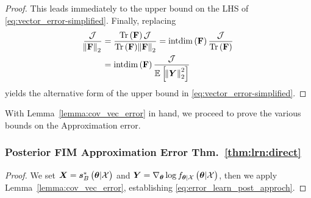 \begin{proof}
{   %
This leads immediately to the upper bound on the LHS of \eqref{eq:vector_error-simplified}.  
   } 
    Finally, replacing 
    \begin{align}
        \frac{\mathcal{J}}{\norm{\matsym{F}}_2}&=\frac{\trace{\matsym{\F}}\mathcal{J}}{\trace{\matsym{\F}}\norm{\matsym{F}}_2}=\mathrm{intdim}\brackets{\F}\frac{\mathcal{J}}{\trace{\matsym{\F}}}\nonumber\\
                                              &=\mathrm{intdim}\brackets{\F}\frac{\mathcal{J}}{\expectation{\norm{\Yr}_2^2}{}}
    \end{align}
    {yields the alternative form of the upper bound in \eqref{eq:vector_error-simplified}.}
\end{proof}
{With} Lemma~\ref{lemma:cov_vec_error} {in hand,} we {proceed to prove the various bounds on the {Approximation error}}.
\subsubsection{Posterior {FIM } {Approximation Error} {Thm.~\ref{thm:lrn:direct}}}\label{proof:post:lrn}
\begin{proof}
    We set $\Xr=\postscores{\p}{\xset}$ and $\Yr=\nabla_{\p}\log\probt{\p|\xset}{\p|\xset}$, then we apply Lemma~\ref{lemma:cov_vec_error}, 
    {establishing \eqref{eq:error_learn_post_approch}}. 
\end{proof}

